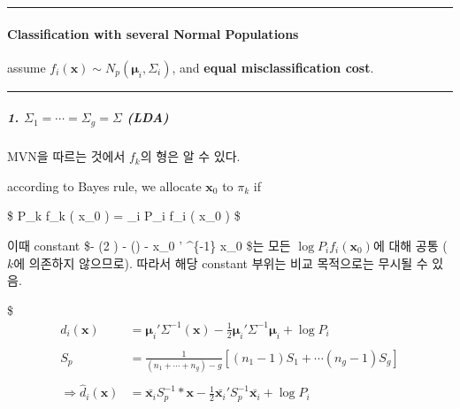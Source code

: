 \documentclass[
]{book}
\begin{document}
{{{\begin{center}\rule{0.5\linewidth}{0.5pt}\end{center}

\hypertarget{classification-with-several-normal-populations}{%
\paragraph{Classification with several Normal Populations}\label{classification-with-several-normal-populations}}

assume \(f_i (\pmb x) \sim N_p (\pmb \mu_i , \Sigma_i )\), and \textbf{equal misclassification cost}.

\begin{center}\rule{0.5\linewidth}{0.5pt}\end{center}

\hypertarget{sigma_1-cdots-sigma_g-sigma-lda}{%
\subparagraph{\texorpdfstring{1. \(\Sigma_1 = \cdots = \Sigma_g = \Sigma\) (LDA)}{1. \textbackslash Sigma\_1 = \textbackslash cdots = \textbackslash Sigma\_g = \textbackslash Sigma (LDA)}}\label{sigma_1-cdots-sigma_g-sigma-lda}}

MVN을 따르는 것에서 \(f_k\)의 형은 알 수 있다.

according to Bayes rule, we allocate \(\pmb x_0\) to \(\pi_k\) if

\$
\log P\_k f\_k ( \pmb x\_0 ) = \max\_i \log P\_i f\_i ( \pmb x\_0 )
\$

이때 constant \$- \log(2 \pi) - \log(\vert \Sigma \vert) - \pmb x\_0 ' \Sigma\^{}\{-1\} \pmb x\_0 \$는 모든 \(\log P_i f_i (\pmb x_0)\)에 대해 공통 (\(k\)에 의존하지 않으므로). 따라서 해당 constant 부위는 비교 목적으로는 무시될 수 있음.

\$
\begin{align*}

d_i (\pmb x) &= \pmb \mu_i ' \Sigma^{-1} \left( \pmb x \right) - \tfrac{1}{2} \pmb \mu_i ' \Sigma^{-1} \pmb \mu_i + \log P_i \tag{1} \\

\\

S_p &= \tfrac{1}{(n_1 + \cdots +n_g) - g} \left[ (n_1-1)S_1 + \cdots (n_g - 1)S_g  \right] \tag{2} \\

\\

\Longrightarrow \hat d_i (\pmb x) &= \bar { \pmb x_i} S_p^{-1} \ast \pmb x - \tfrac{1}{2} \bar { \pmb x_i} ' S_p^{-1} \bar { \pmb x_i} + \log P_i \tag{3}


\end{align*}}}}
\end{document}
